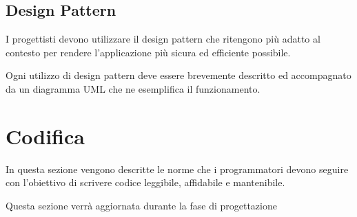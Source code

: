 \subsection{Design Pattern}

I progettisti devono utilizzare il design pattern che ritengono più adatto al contesto per rendere l’applicazione più sicura ed efficiente possibile.

Ogni utilizzo di design pattern deve essere brevemente descritto ed accompagnato da un diagramma UML che ne esemplifica il funzionamento.

\section{Codifica}
In questa sezione vengono descritte le norme che i programmatori devono seguire con l’obiettivo di scrivere codice leggibile, affidabile e mantenibile.

Questa sezione verrà aggiornata durante la fase di progettazione

